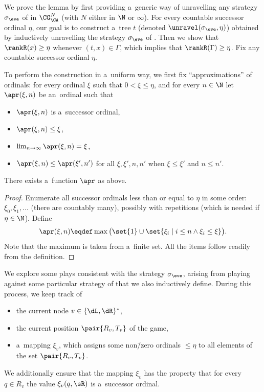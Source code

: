 \lemSoundness*
\noindent %
We prove the lemma by first providing a~generic way of unravelling any strategy $\sigma_\eve$ of \eve in $\CG^N_\CA$ (with $N$ either in $\N$ or $\infty$).
For every countable successor ordinal $\eta$, our goal is to construct a~tree $t$ (denoted $\unravel(\sigma_\eve, \eta)$) obtained by inductively unravelling the strategy $\sigma_\eve$ of \eve.
Then we show that $\rankR(x)\geq\eta$ whenever $(t,x)\in\Gamma$, which implies that $\rankR(\Gamma)\geq \eta$.
Fix any countable successor ordinal $\eta$.

To perform the construction in a~uniform way, we first fix ``approximations'' of ordinals:
for every ordinal $\xi$ such that $0<\xi\leq\eta$, and for every $n\in\N$ let $\apr(\xi,n)$ be an~ordinal such that
\begin{itemize}
\item	$\apr(\xi,n)$ is a~successor ordinal,
\item	$\apr(\xi,n)\leq\xi$,
\item	$\lim_{n\to\infty}\apr(\xi,n)=\xi$,
\item	$\apr(\xi,n)\leq\apr(\xi',n')$ for all $\xi,\xi',n, n'$ when $\xi\leq\xi'$ and $n\leq n'$.
\end{itemize}

\begin{lem}
	There exists a~function $\apr$ as above.
\end{lem}

\begin{proof}
	Enumerate all successor ordinals less than or equal to $\eta$ in some order: $\xi_0,\xi_1,\dots$ (there are countably many),
	possibly with repetitions (which is needed if $\eta\in\N$).
	Define
	\[\apr(\xi,n)\eqdef\max\big(\set{1}\cup\set{\xi_i\mid i\leq n\land\xi_i\leq\xi}\big).\]
	Note that the maximum is taken from a~finite set.
	All the items follow readily from the definition.
\end{proof}

We explore some plays consistent with the strategy $\sigma_\eve$, arising from playing against some particular strategy of \adam that we also inductively define.
During this process, we keep track of
\begin{itemize}
\item the current node $v\in\{\dL,\dR\}^\ast$,
\item the current position $\pair{R_v, T_v}$ of the game,
\item a~mapping $\xi_v$, which assigns some non\=/zero ordinals $\leq \eta$ to all elements of the set $\pair{R_v,T_v}$.
\end{itemize}
We additionally ensure that the mapping $\xi_v$ has the property that for every $q\in R_v$ the value $\xi_v(q,\sR)$ is a~successor ordinal.

